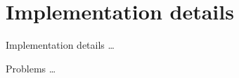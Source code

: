 \section[Implementation details]{Implementation details}	

	\begin{frame}{Implementation details}
		\dots
		
		\note{
			\dots			
		}		
		
	\end{frame}

	\begin{frame}{Problems}
		\dots
		
		\note{
			\dots			
		}		
		
	\end{frame}
